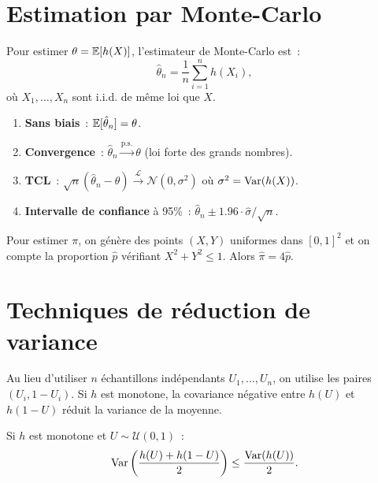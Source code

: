 \section{Estimation par Monte-Carlo}

\begin{definition}
Pour estimer $\theta = \mathbb{E}[h(X)]$, l'estimateur de Monte-Carlo est~:
\[
  \hat{\theta}_n = \frac{1}{n} \sum_{i=1}^n h(X_i),
\]
o\`u $X_1, \ldots, X_n$ sont i.i.d. de m\^eme loi que $X$.
\end{definition}

\begin{theoreme}
\begin{enumerate}
  \item \textbf{Sans biais}~: $\mathbb{E}[\hat{\theta}_n] = \theta$.
  \item \textbf{Convergence}~: $\hat{\theta}_n \xrightarrow{\text{p.s.}} \theta$
        (loi forte des grands nombres).
  \item \textbf{TCL}~: $\sqrt{n}(\hat{\theta}_n - \theta)
        \xrightarrow{\mathcal{L}} \mathcal{N}(0, \sigma^2)$
        o\`u $\sigma^2 = \mathrm{Var}(h(X))$.
  \item \textbf{Intervalle de confiance} \`a 95\%~:
        $\hat{\theta}_n \pm 1.96 \cdot \hat{\sigma}/\sqrt{n}$.
\end{enumerate}
\end{theoreme}

\begin{exemple}[Estimation de $\pi$]
Pour estimer $\pi$, on g\'en\`ere des points $(X, Y)$ uniformes dans
$[0,1]^2$ et on compte la proportion $\hat{p}$ v\'erifiant
$X^2 + Y^2 \leq 1$. Alors $\hat{\pi} = 4\hat{p}$.
\end{exemple}

\section{Techniques de r\'eduction de variance}

\begin{definition}
Au lieu d'utiliser $n$ \'echantillons ind\'ependants $U_1, \ldots, U_n$, on
utilise les paires $(U_i, 1-U_i)$. Si $h$ est monotone, la covariance
n\'egative entre $h(U)$ et $h(1-U)$ r\'eduit la variance de la moyenne.
\end{definition}

\begin{proposition}
Si $h$ est monotone et $U \sim \mathcal{U}(0,1)$~:
\[
  \mathrm{Var}\left(\frac{h(U) + h(1-U)}{2}\right) \leq \frac{\mathrm{Var}(h(U))}{2}.
\]
\end{proposition}

